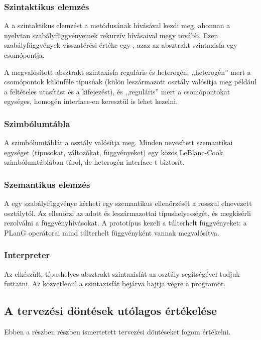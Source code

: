 \subsubsection{Szintaktikus elemzés}
A  a szintaktikus elemzést a   metódusának hívásával kezdi meg, ahonnan a nyelvtan szabályfüggvényeinek rekurzív hívásaival megy tovább.
Ezen szabályfüggvények visszatérési értéke egy , azaz az absztrakt szintaxisfa egy csomópontja.

A megvalósított absztrakt szintaxisfa reguláris és heterogén: ,,heterogén'' mert a csomópontok különféle típusúak (külön leszármazott osztály valósítja meg például a feltételes utasítást és a kifejezést), és ,,reguláris'' mert a csomópontokat egységes, homogén interface-en keresztül is lehet kezelni.

\subsubsection{Szimbólumtábla}
A szimbólumtáblát a  osztály valósítja meg. Minden nevesített szemantikai egységet (típusokat, változókat, függvényeket) egy közös LeBlanc-Cook szimbólumtáblában tárol\cite[lásd][30]{ScottProgPrag}, de heterogén interface-t biztosít.

\subsubsection{Szemantikus elemzés}
A  egy szabályfüggvénye kérheti egy  szemantikus ellenőrzését a rosszul elnevezett  osztálytól.
Az  ellenőrzi az adott  és leszármazottai típushelyességét, és megkísérli rezolválni a függvényhívásokat.
A prototípus kezeli a túlterhelt függvényeket: a PLanG operátorai mind túlterhelt függvényként vannak megvalósítva.

\subsubsection{Interpreter}
Az elkészült, típushelyes absztrakt szintaxisfát az  osztály segítségével tudjuk futtatni.
Az  közvetlenül a szintaxisfát bejárva hajtja végre a programot.



\subsection{A tervezési döntések utólagos értékelése} \label{subsec:planres}
Ebben a részben  részben ismertetett tervezési döntéseket fogom értékelni.

